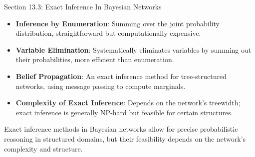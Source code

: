 \begin{notes}{Section 13.3: Exact Inference In Bayesian Networks}
\begin{highlight}
    \end{highlight}
    
    \begin{highlight}
    
        \begin{itemize}
            \item \textbf{Inference by Enumeration}: Summing over the joint probability distribution, straightforward but computationally expensive.
            \item \textbf{Variable Elimination}: Systematically eliminates variables by summing out their probabilities, more efficient than enumeration.
            \item \textbf{Belief Propagation}: An exact inference method for tree-structured networks, using message passing to compute marginals.
            \item \textbf{Complexity of Exact Inference}: Depends on the network's treewidth; exact inference is generally NP-hard but feasible for certain structures.
        \end{itemize}
    
        Exact inference methods in Bayesian networks allow for precise probabilistic reasoning in structured domains, but their feasibility depends on the network's complexity and structure.
    
    \end{highlight}
\end{notes}